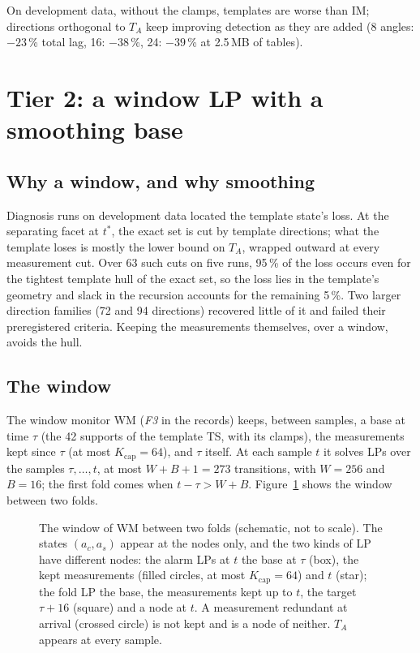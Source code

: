 \documentclass[11pt,a4paper]{article}
\newcommand{\tstar}{t^{\ast}}
\begin{document}
On development data, without the clamps, templates are worse than IM; directions orthogonal to $T_A$ keep improving
detection as they are added (8 angles: $-23$\,\% total lag, 16: $-38$\,\%, 24: $-39$\,\% at 2.5\,MB of tables).

\section{Tier 2: a window LP with a smoothing base}

\subsection{Why a window, and why smoothing}

Diagnosis runs on development data located the template state's loss. At the separating facet at $\tstar$, the exact
set is cut by template directions; what the template loses is mostly the lower bound on $T_A$, wrapped outward at every
measurement cut. Over 63 such cuts on five runs, 95\,\% of the loss occurs even for the tightest template hull of the
exact set, so the loss lies in the template's geometry and slack in the recursion accounts for the remaining 5\,\%. Two
larger direction families (72 and 94 directions) recovered little of it and failed their preregistered criteria.
Keeping the measurements themselves, over a window, avoids the hull.

\subsection{The window}

The window monitor WM (\emph{F3} in the records) keeps, between samples, a base at time $\tau$ (the 42 supports of the
template TS, with its clamps), the measurements kept since $\tau$ (at most $K_{\mathrm{cap}} = 64$), and $\tau$ itself.
At each sample $t$ it solves LPs over the samples $\tau,\dots,t$, at most $W+B+1 = 273$ transitions, with $W = 256$
and $B = 16$; the first fold comes when $t-\tau > W+B$. Figure~\ref{fig:window} shows the window between two folds.

\begin{figure}[t]
\centering

\caption{The window of WM between two folds (schematic, not to scale). The states $(a_c, a_s)$ appear at the nodes
only, and the two kinds of LP have different nodes: the alarm LPs at $t$ the base at $\tau$ (box), the kept
measurements (filled circles, at most $K_{\mathrm{cap}} = 64$) and $t$ (star); the fold LP the base, the measurements
kept up to $t$, the target $\tau+16$ (square) and a node at $t$. A measurement redundant at arrival (crossed circle) is not kept and
is a node of neither. $T_A$ appears at every sample.}
\label{fig:window}
\end{figure}
\end{document}
